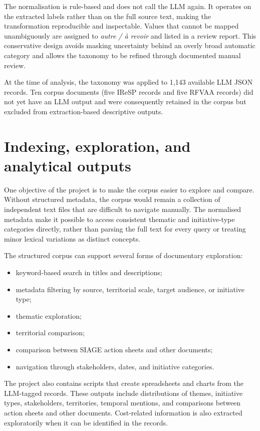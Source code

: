 \documentclass[
11pt,
english,
singlespacing,
headsepline,
]{MastersDoctoralThesis}
\begin{document}
The normalisation is rule-based and does not call the LLM again. It operates on
the extracted labels rather than on the full source text, making the
transformation reproducible and inspectable. Values that cannot be mapped
unambiguously are assigned to \textit{autre / à revoir} and listed in a review
report. This conservative design avoids masking uncertainty behind an overly
broad automatic category and allows the taxonomy to be refined through
documented manual review.

At the time of analysis, the taxonomy was applied to 1,143 available LLM JSON
records. Ten corpus documents (five IReSP records and five RFVAA records) did
not yet have an LLM output and were consequently retained in the corpus but
excluded from extraction-based descriptive outputs.

\section{Indexing, exploration, and analytical outputs}

One objective of the project is to make the corpus easier to explore and compare.
Without structured metadata, the corpus would remain a collection of independent
text files that are difficult to navigate manually. The normalised metadata make
it possible to access consistent thematic and initiative-type categories
directly, rather than parsing the full text for every query or treating minor
lexical variations as distinct concepts.

The structured corpus can support several forms of documentary exploration:

\begin{itemize}
    \item keyword-based search in titles and descriptions;
    \item metadata filtering by source, territorial scale, target audience, or
    initiative type;
    \item thematic exploration;
    \item territorial comparison;
    \item comparison between SIAGE action sheets and other documents;
    \item navigation through stakeholders, dates, and initiative categories.
\end{itemize}

The project also contains scripts that create spreadsheets and charts from the
LLM-tagged records. These outputs include distributions of themes, initiative
types, stakeholders, territories, temporal mentions, and comparisons between
action sheets and other documents. Cost-related information is also extracted
exploratorily when it can be identified in the records.
\end{document}
